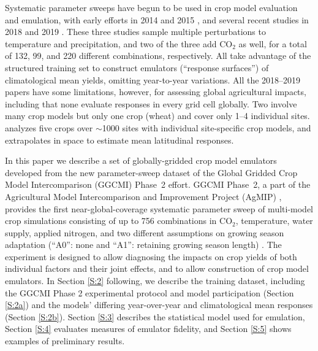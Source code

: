 \documentclass[gmdd]{copernicus} %
\begin{document}
Systematic parameter sweeps have begun to be used in crop model evaluation and emulation, with early efforts in 2014 and 2015 \citep{ruane2014, Markowski2015, Pirttioja2015}, and several recent studies in 2018 and 2019 \citep{FRONZEK20182, RUIZRAMOS2018,Snyder2018}. 
These three studies sample multiple perturbations to temperature and precipitation, and two of the three add CO$_2$ as well, for a total of 132, 99, and 220 different combinations, respectively. 
All take advantage of the structured training set to construct emulators (``response surfaces'') of climatological mean yields, omitting year-to-year variations. 
All the 2018--2019 papers have some limitations, however, for assessing global agricultural impacts, including that
none evaluate responses in every grid cell globally.
Two involve many crop models but only one crop (wheat) \citep{FRONZEK20182, RUIZRAMOS2018} and cover only 1--4 individual sites. 
\citet{Snyder2018} analyzes five crops over $\sim$1000 sites with individual site-specific crop models, and extrapolates in space to estimate mean latitudinal responses.

In this paper we describe a set of globally-gridded crop model emulators developed from the new parameter-sweep dataset of the Global Gridded Crop Model Intercomparison (GGCMI) Phase~2 effort. 
GGCMI Phase~2, a part of the Agricultural Model Intercomparison and Improvement Project (AgMIP) \citep{ROSENZWEIG2013, Rosenzweig2014}, provides the first near-global-coverage systematic parameter sweep of multi-model crop simulations consisting of up to 756 combinations in CO$_2$, temperature, water supply, applied nitrogen, and two different assumptions on growing season adaptation (``A0'': none and ``A1'': retaining growing season length) \citep[CTWN-A,][]{franke2020ctwnexperiment,minoli2019adaptation}.
The experiment is designed to allow diagnosing the impacts on crop yields of both individual factors and their joint effects, and to allow construction of crop model emulators.
In Section \ref{S:2} following, we describe the training dataset, including the GGCMI Phase 2 experimental protocol and model participation (Section \ref{S:2a}) and the models' differing year-over-year and climatological mean responses (Section \ref{S:2b}). Section \ref{S:3} describes the statistical model used for emulation, Section \ref{S:4} evaluates measures of emulator fidelity, and Section \ref{S:5} shows examples of preliminary results. 

 
\end{document}
